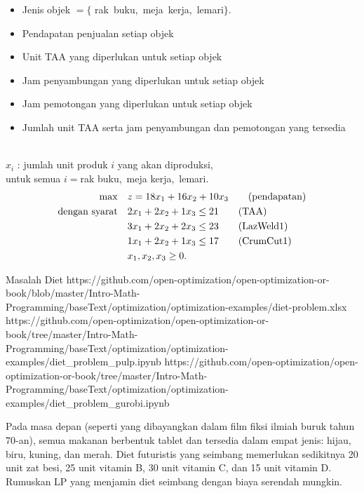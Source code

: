 \begin{solution}

\noindent\medskip {}
\begin{itemize}
\item Jenis objek $ = \{$ rak~buku,~meja~kerja,~lemari$\}$.
\end{itemize}
\medskip {} 
\begin{itemize}
\item Pendapatan penjualan setiap objek
\item Unit TAA yang diperlukan untuk setiap objek
\item Jam penyambungan yang diperlukan untuk setiap objek
\item Jam pemotongan yang diperlukan untuk setiap objek
\item Jumlah unit TAA serta jam penyambungan dan pemotongan yang tersedia
\end{itemize}

\noindent\medskip {} \\
$x_i$ : jumlah unit produk $i$ yang akan diproduksi, \\
untuk semua $ i = $rak buku,~meja kerja,~lemari.\\

\noindent \medskip {}
\begin{align*}
\max \quad & z = 18x_1 + 16x_2 + 10x_3   \tag{pendapatan} \\
\mbox{dengan syarat}\quad        & 2x_1 + 2x_2 + 1x_3 \le 21   \tag{TAA} \\
& 3x_1 + 2x_2 + 2x_3 \le 23   \tag{LazWeld1} \\
& 1x_1 + 2x_2 + 1x_3 \le 17   \tag{CrumCut1} \\
& x_1, x_2, x_3 \ge 0.
\end{align*}
\end{solution}

\begin{examplewithallcode}{Masalah Diet}
{https://github.com/open-optimization/open-optimization-or-book/blob/master/Intro-Math-Programming/baseText/optimization/optimization-examples/diet-problem.xlsx}
{https://github.com/open-optimization/open-optimization-or-book/tree/master/Intro-Math-Programming/baseText/optimization/optimization-examples/diet_problem_pulp.ipynb}
{https://github.com/open-optimization/open-optimization-or-book/tree/master/Intro-Math-Programming/baseText/optimization/optimization-examples/diet_problem_gurobi.ipynb}
\label{example:diet-problem}

Pada masa depan (seperti yang dibayangkan dalam film fiksi ilmiah buruk tahun 70-an), semua makanan berbentuk tablet dan tersedia dalam empat jenis: hijau, biru, kuning, dan merah. Diet futuristis yang seimbang memerlukan sedikitnya 20 unit zat besi, 25 unit vitamin B, 30 unit vitamin C, dan 15 unit vitamin D. Rumuskan LP yang menjamin diet seimbang dengan biaya serendah mungkin.
\end{examplewithallcode}

